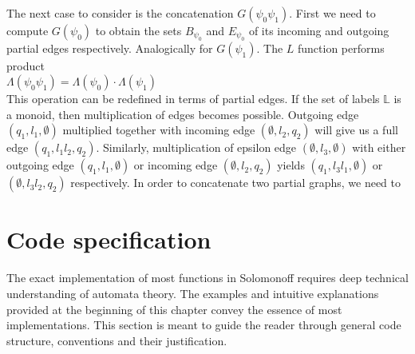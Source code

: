 The next case to consider is the concatenation $G(\psi_0 \psi_1)$. 
First we need to compute $G(\psi_0)$ to obtain the sets $B_{\psi_0}$ and $E_{\psi_0}$ of its incoming and outgoing partial edges respectively. 
Analogically for $G(\psi_1)$. The $L$ function performs product \\
$\Lambda(\psi_0\psi_1) =\Lambda(\psi_0) \cdot \Lambda(\psi_1)$ \\
This operation can be redefined in terms of partial edges. If the set of labels $\mathbb{L}$ is a monoid, then multiplication of edges becomes possible.  Outgoing edge $(q_1,l_1,\emptyset)$ multiplied together with incoming edge $(\emptyset,l_2,q_2)$ will give us a full edge $(q_1,l_1 l_2 ,q_2)$. Similarly, multiplication of epsilon edge $(\emptyset,l_3,\emptyset)$ with either outgoing edge $(q_1,l_1,\emptyset)$ or incoming edge $(\emptyset,l_2,q_2)$ yields $(q_1,l_3 l_1,\emptyset)$ or $(\emptyset,l_3 l_2,q_2)$ respectively. In order to concatenate two partial graphs, we need to 












\section{Code specification}

The exact implementation of most functions in Solomonoff requires deep technical understanding of automata theory. The examples and intuitive explanations provided at the beginning of this chapter convey the essence of most implementations. This section is meant to guide the reader through general code structure, conventions and their justification. 

